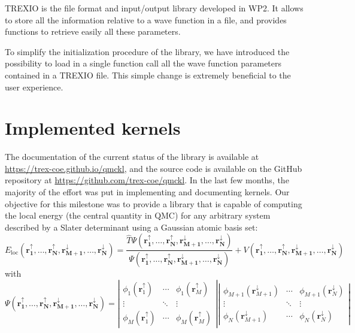 \ac{TREXIO} is the file format and input/output library developed in
\ac{WP}2. It allows to store all the information relative to a wave
function in a file, and provides functions to retrieve easily all
these parameters. 

To simplify the initialization procedure of the library, we have
introduced the possibility to load in a single function call all the
wave function parameters contained in a \ac{TREXIO} file. This simple
change is extremely beneficial to the user experience.


\section{Implemented kernels}

The documentation of the current status of the library is available
at \url{https://trex-coe.github.io/qmckl}, and the source code is
available on the GitHub repository at \url{https://github.com/trex-coe/qmckl}.
In the last few months, the majority of the effort was put in
implementing and documenting kernels.  Our objective for this milestone
was to provide a library that is capable of computing the local energy
(the central quantity in \ac{QMC}) for any arbitrary system described
by a Slater determinant using a Gaussian atomic basis set:
\newcommand{\eloc}{E_{\text{loc}}}
\newcommand{\rr}{\mathbf{r_1^\uparrow,\dots,r_N^\uparrow, r_{M+1}^\downarrow,\dots,r_N^\downarrow}}
\[
\eloc\left(\rr\right) = \frac{\hat{T}{\Psi\left(\rr\right)}}{\Psi\left(\rr\right)}
+ V\left(\rr\right)
\]
with
\[
\Psi\left(\mathbf{r_1^\uparrow,\dots,r_N^\uparrow, r_{M+1}^\downarrow,\dots,r_N^\downarrow}\right) = 
\left|
\begin{array}{ccc}
\phi_1\left(\mathbf{r}_1^\uparrow\right) & \cdots & \phi_1\left(\mathbf{r}_M^\uparrow\right) \\
\vdots & \ddots & \vdots \\
\phi_M\left(\mathbf{r}_1^\uparrow\right) & \cdots & \phi_M\left(\mathbf{r}_M^\uparrow\right) 
\end{array}
\right|
\left|
\begin{array}{ccc}
\phi_{M+1}\left(\mathbf{r}_{M+1}^\downarrow\right) & \cdots & \phi_{M+1}\left(\mathbf{r}_N^\downarrow\right) \\
\vdots & \ddots & \vdots \\
\phi_N\left(\mathbf{r}_{M+1}^\downarrow\right) & \cdots & \phi_N\left(\mathbf{r}_N^\downarrow\right) 
\end{array}
\right|
\]

